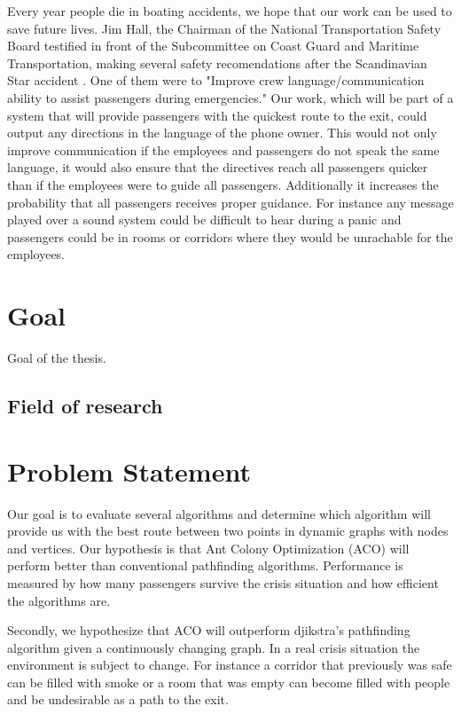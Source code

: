 Every year people die in boating accidents, we hope that our work can be
used to save future lives. Jim Hall, the Chairman of the National Transportation 
Safety Board testified in front of the Subcommittee on Coast Guard and Maritime 
Transportation, making several safety recomendations after the Scandinavian Star
accident \cite{ntsb}. One of them were to "Improve crew language/communication 
ability to assist passengers during emergencies." Our work, which will be part of a system
that will provide passengers with the quickest route to the exit, could output 
any directions in the language of the phone owner. This would not only improve 
communication if the employees and passengers do not speak the same language, 
it would also ensure that the directives reach all passengers quicker than if the employees 
were to guide all passengers. Additionally it increases the probability that all passengers 
receives proper guidance. For instance any message played over a sound system could be
difficult to hear during a panic and passengers could be in rooms or corridors
where they would be unrachable for the employees.


\section{Goal}
Goal of the thesis.

\subsection{Field of research}

\section{Problem Statement}

Our goal is to evaluate several algorithms and determine which algorithm will provide us with the
best route between two points in dynamic graphs with nodes and vertices. Our hypothesis
is that Ant Colony Optimization (ACO) will perform better than conventional pathfinding
algorithms. Performance is measured by how many passengers survive the crisis situation
and how efficient the algorithms are. 

Secondly, we hypothesize that ACO will outperform djikstra's pathfinding algorithm
given a continuously changing graph. In a real crisis situation the environment is subject
to change. For instance a corridor that previously was safe can be filled with smoke
or a room that was empty can become filled with people and be undesirable as a path
to the exit.

